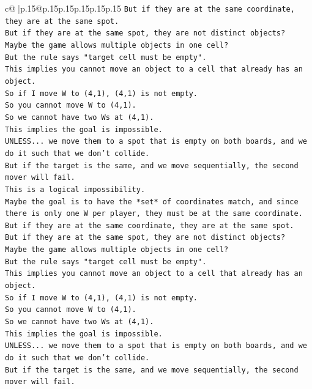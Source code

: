 \documentclass{article}
\begin{document}
{\begin{supertabular}{c@{$\;$}|p{.15\linewidth}@{}p{.15\linewidth}p{.15\linewidth}p{.15\linewidth}p{.15\linewidth}p{.15\linewidth}}
{{{\texttt{But if they are at the same coordinate, they are at the same spot.} \\
\texttt{But if they are at the same spot, they are not distinct objects?} \\
\texttt{Maybe the game allows multiple objects in one cell?} \\
\texttt{But the rule says "target cell must be empty".} \\
\texttt{This implies you cannot move an object to a cell that already has an object.} \\
\texttt{So if I move W to (4,1), (4,1) is not empty.} \\
\texttt{So you cannot move W to (4,1).} \\
\texttt{So we cannot have two Ws at (4,1).} \\
\texttt{This implies the goal is impossible.} \\
\texttt{UNLESS... we move them to a spot that is empty on both boards, and we do it such that we don't collide.} \\
\texttt{But if the target is the same, and we move sequentially, the second mover will fail.} \\
\texttt{This is a logical impossibility.} \\
\texttt{Maybe the goal is to have the *set* of coordinates match, and since there is only one W per player, they must be at the same coordinate.} \\
\texttt{But if they are at the same coordinate, they are at the same spot.} \\
\texttt{But if they are at the same spot, they are not distinct objects?} \\
\texttt{Maybe the game allows multiple objects in one cell?} \\
\texttt{But the rule says "target cell must be empty".} \\
\texttt{This implies you cannot move an object to a cell that already has an object.} \\
\texttt{So if I move W to (4,1), (4,1) is not empty.} \\
\texttt{So you cannot move W to (4,1).} \\
\texttt{So we cannot have two Ws at (4,1).} \\
\texttt{This implies the goal is impossible.} \\
\texttt{UNLESS... we move them to a spot that is empty on both boards, and we do it such that we don't collide.} \\
\texttt{But if the target is the same, and we move sequentially, the second mover will fail.} \\
}}}
\end{supertabular}}
\end{document}
